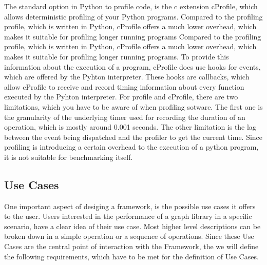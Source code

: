 
The standard option in Python to profile code, is the c extension cProfile,
which allows deterministic profiling of your Python programs. Compared to the
profiling profile, which is written in Python, cProfile offers a much lower
overhead, which makes it suitable for profiling longer running programs Compared
to the profiling profile, which is written in Python, cProfile offers a much
lower overhead, which makes it suitable for profiling longer running programs.
To provide this information about the execution of a program, cProfile does use
hooks for events, which are offered by the Pyhton interpreter. These hooks are
callbacks, which allow cProfile to receive and record timing information about
every function executed by the Pyhton interpreter. For profile and cProfile,
there are two limitations, which you have to be aware of when profiling sotware.
The first one is the granularity of the underlying timer used for recording the
duration of an operation, which is mostly around 0.001 seconds. The other
limitation is the lag between the event being dispatched and the profiler to get
the current time. Since profiling is introducing a certain overhead to the
execution of a python program, it is not suitable for benchmarking itself.


\subsection{Use Cases}

\label{sec:application:analysis:usecase}

One important aspect of desiging a framework, is the possible use cases it
offers to the user. Users interested in the performance of a graph library in a
specific scenario, have a clear idea of their use case. Most higher level
descriptions can be broken down in a simple operation or a sequence of
operations. Since these Use Cases are the central point of interaction with the
Framework, the we will define the following requirements, which have to be met
for the definition of Use Cases.

